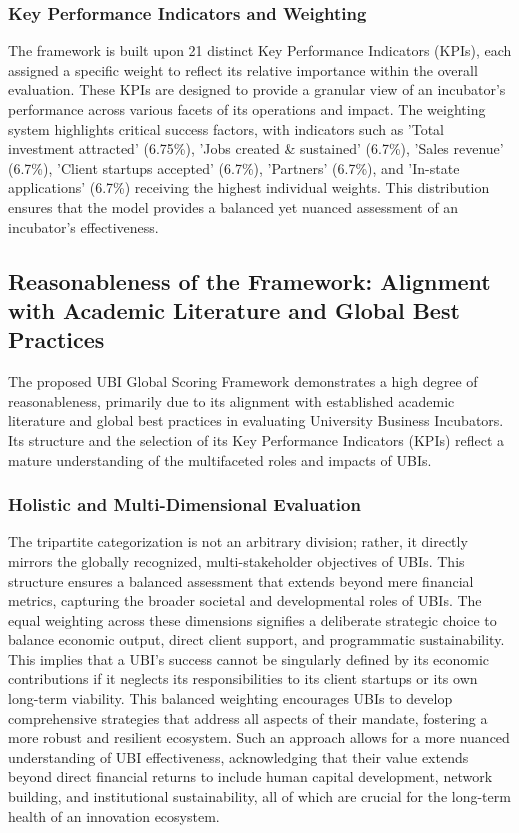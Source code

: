\documentclass[../Main.tex]{subfiles}
\begin{document}
\subsubsection{Key Performance Indicators and Weighting}

The framework is built upon 21 distinct Key Performance Indicators (KPIs), each assigned a specific weight to reflect its relative importance within the overall evaluation. These KPIs are designed to provide a granular view of an incubator's performance across various facets of its operations and impact. The weighting system highlights critical success factors, with indicators such as 'Total investment attracted' (6.75\%), 'Jobs created \& sustained' (6.7\%), 'Sales revenue' (6.7\%), 'Client startups accepted' (6.7\%), 'Partners' (6.7\%), and 'In-state applications' (6.7\%) receiving the highest individual weights. This distribution ensures that the model provides a balanced yet nuanced assessment of an incubator's effectiveness.

\subsection{Reasonableness of the Framework: Alignment with Academic Literature and Global Best Practices}

The proposed UBI Global Scoring Framework demonstrates a high degree of reasonableness, primarily due to its alignment with established academic literature and global best practices in evaluating University Business Incubators. Its structure and the selection of its Key Performance Indicators (KPIs) reflect a mature understanding of the multifaceted roles and impacts of UBIs.

\subsubsection{Holistic and Multi-Dimensional Evaluation}
The tripartite categorization is not an arbitrary division; rather, it directly mirrors the globally recognized, multi-stakeholder objectives of UBIs. This structure ensures a balanced assessment that extends beyond mere financial metrics, capturing the broader societal and developmental roles of UBIs. The equal weighting across these dimensions signifies a deliberate strategic choice to balance economic output, direct client support, and programmatic sustainability. This implies that a UBI's success cannot be singularly defined by its economic contributions if it neglects its responsibilities to its client startups or its own long-term viability. This balanced weighting encourages UBIs to develop comprehensive strategies that address all aspects of their mandate, fostering a more robust and resilient ecosystem. Such an approach allows for a more nuanced understanding of UBI effectiveness, acknowledging that their value extends beyond direct financial returns to include human capital development, network building, and institutional sustainability, all of which are crucial for the long-term health of an innovation ecosystem.
\end{document}
